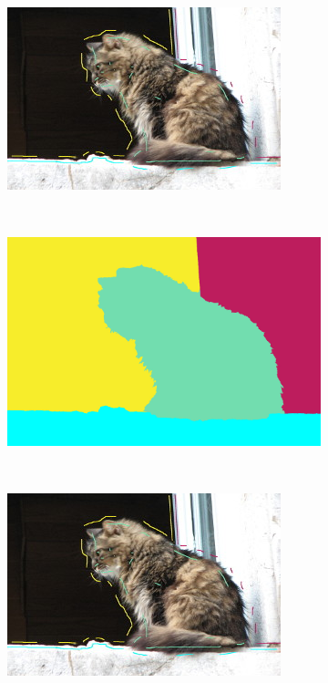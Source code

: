 \begin{figure}[htb]
\begin{subfigure}{0.4\textwidth}
 \end{subfigure}
 \\
 \begin{subfigure}{0.4\textwidth}	
\includegraphics[width=\textwidth]{images/evaluation/004_seeds2.jpg}
 \end{subfigure}
 ~
 \begin{subfigure}{0.4\textwidth}	
\includegraphics[width=\textwidth]{images/evaluation/004_res2.jpg}
 \end{subfigure}
 \\
 \begin{subfigure}{0.4\textwidth}	
\includegraphics[width=\textwidth]{images/evaluation/004_seeds3.jpg}

\end{subfigure}
\end{figure}
